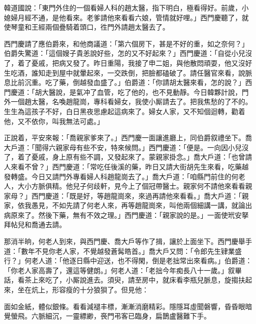韓道國說：「東門外住的一個看婦人科的趙太醫，指下明白，極看得好。前歲，小媳婦月經不通，{}是他看來。老爹請他來看看六娘，管情就好哩。」西門慶聽了，就使琴童和王經兩個疊騎着頭口，徃門外請趙太醫去了。

西門慶請了應伯爵來，和他商議道：「第六個房下，甚是不好的重，如之奈何？」伯爵失驚道：「這個嫂子貴恙說好些，怎的又不好起來？」西門慶道：「自從小兒沒了，着了憂戚，把病又發了。昨日重陽，我接了申二姐，與他散悶頑耍，他又沒好生吃酒，誰知走到屋中就暈起來，一交跌倒，把臉都磕破了。請任醫官來看，說脈息比前沉重。吃了藥，倒越發血盛了。」伯爵道：「你請胡太醫來看，怎的說？」西門慶道：「胡大醫說，是氣冲了血管，吃了他的，也不見動靜。今日韓夥計說，門外一個趙太醫，名喚趙龍崗，專科看婦女，我使小厮請去了。把我焦愁的了不的。生生為這孩子不好，白日黑夜思慮起這病來了。婦女人家，又不知個迴轉，勸着他，又不依你，叫我無法可處。」{}

正說着，平安來報：「喬親家爹來了。」西門慶一面讓進廳上，同伯爵叙禮坐下。喬大戶道：「聞得六親家母有些不安，特來候問。」西門慶道：「便是。一向因小兒沒了，着了憂戚，身上原有些不調，又發起來了。蒙親家掛念。」喬大戶道：「也曾請人來看不曾？」西門慶道：「常吃任後溪的藥，昨日又請大街胡先生來看，吃藥越發轉盛。今日又請門外專看婦人科趙龍崗去了。」喬大戶道：「咱縣門前住的何老人，大小方脈俱精。他兒子何歧軒，見今上了個冠帶醫士。親家何不請他來看看親家母？」西門慶道：「既是好，等趙龍崗來，來過再請他來看看。」喬大戶道：「親家，依我愚見，不如先請了何老人來，再等趙龍崗來，叫他兩個細講一講，就論出病原來了。{}然後下藥，無有不效之理。」西門慶道：「親家說的是。」一面使玳安拏拜帖兒和喬通去請。

那消半晌，何老人到來，與西門慶、喬大戶等作了揖，讓於上面坐下。西門慶舉手道：「數年不見你老人家，不覺越發蒼髯皓首。」喬大戶又問：「令郎先生肄業盛行？」何老人道：「他逐日縣中迎送，也不得閑，倒是老拙常出來看病。」伯爵道：「你老人家高壽了，還這等健朗。」何老人道：「老拙今年痴長八十一歲。」叙畢話，看茶上來吃了，小厮說進去。須臾，請至房中，就床看李瓶兒脈息，旋搊扶起來，坐在炕上，形容瘦的十分狼狽了。但見他：

\begin{myquote}
面如金紙，體似銀條。看看減褪丰標，漸漸消磨精彩。隱隱耳虛聞磐響，昏昏眼暗覺螢飛。六脈細沉，一靈縹緲，䘮門弔客已臨身，扁鵲盧醫難下手。
\end{myquote}

